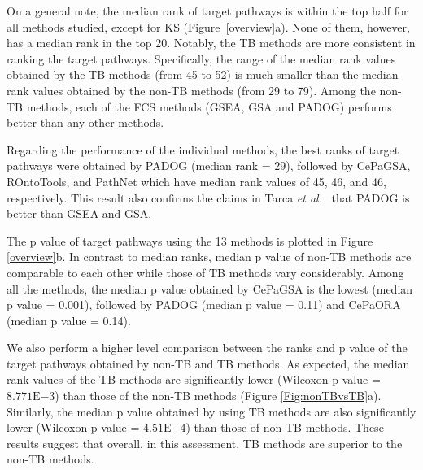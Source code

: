 \documentclass[Minh_PhD_thesis.tex]{subfiles}
\begin{document}
On a general note, the median rank of target pathways is within the top half for all methods studied, except for KS (Figure~\ref{overview}a). 
None of them, however, has a median rank in the top 20.
Notably, the TB methods are more consistent in ranking the target pathways. 
Specifically, the range of the median rank values obtained by the TB methods (from 45 to 52) is much smaller than the median rank values obtained by the non-TB methods (from 29 to 79). 
Among the non-TB methods, each of the FCS methods (GSEA, GSA and PADOG) performs better than any other methods.

Regarding the performance of the individual methods, the best ranks of target pathways were obtained by PADOG (median rank = 29), followed by CePaGSA, ROntoTools, and PathNet which have median rank values of 45, 46, and 46, respectively. This result also confirms the claims in Tarca \textit{et al.}~\cite{Tarca2012down} that PADOG is better than GSEA and GSA. 

The p value of target pathways using the 13 methods is plotted in Figure \ref{overview}b. In contrast to median ranks, median p value of non-TB methods are comparable to each other while those of TB methods vary considerably.
Among all the methods, the median p value obtained by CePaGSA is the lowest (median p value = 0.001), followed by PADOG (median p value = 0.11) and  CePaORA (median p value = 0.14). 

We also perform a higher level comparison between the ranks and p value of the target pathways obtained by non-TB and TB methods.
As expected, the median rank values of the TB methods are significantly lower (Wilcoxon p value = $8.771\mathrm{E}{-3}$) than those of the non-TB methods (Figure \ref{Fig:nonTBvsTB}a). 
Similarly, the median p value obtained by using TB methods are also significantly lower (Wilcoxon p value = $4.51\mathrm{E}{-4}$) than those of non-TB methods. These results suggest that overall, in this assessment, TB methods are superior to the non-TB methods. 
\end{document}
